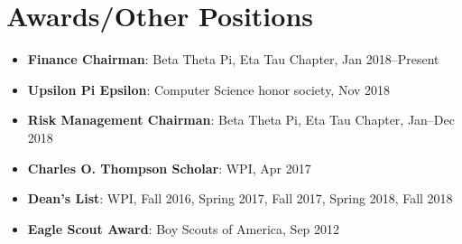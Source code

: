 \documentclass[letterpaper,11pt]{article}
\newcommand{\resumeItem}[2]{
  \item\small{
    \textbf{#1}{: #2 \vspace{-2pt}}
  }
}
\newcommand{\resumeSubItem}[2]{\resumeItem{#1}{#2}\vspace{-4pt}}
\newcommand{\resumeSubHeadingListStart}{\begin{itemize}[leftmargin=*]}
\newcommand{\resumeSubHeadingListEnd}{\end{itemize}}
\begin{document}
\section{Awards/Other Positions}
  \resumeSubHeadingListStart
    \resumeSubItem{Finance Chairman}
      {Beta Theta Pi, Eta Tau Chapter, Jan 2018--Present}
    \resumeSubItem{Upsilon Pi Epsilon}
      {Computer Science honor society, Nov 2018}
    \resumeSubItem{Risk Management Chairman}
      {Beta Theta Pi, Eta Tau Chapter, Jan--Dec 2018}
    \resumeSubItem{Charles O. Thompson Scholar}
      {WPI, Apr 2017}
    \resumeSubItem{Dean's List}
      {WPI, Fall 2016, Spring 2017, Fall 2017, Spring 2018, Fall 2018}
    \resumeSubItem{Eagle Scout Award}
      {Boy Scouts of America, Sep 2012}
  \resumeSubHeadingListEnd

\end{document}
